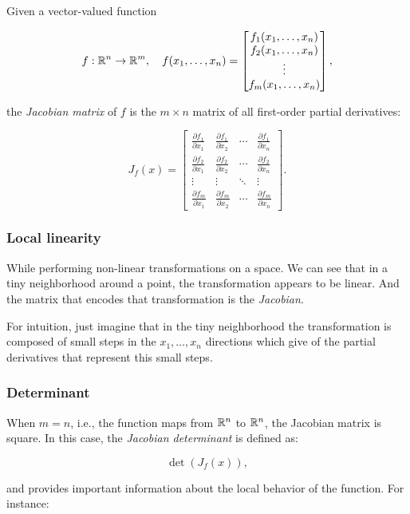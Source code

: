 Given a vector-valued function

\[
    f : \mathbb{R}^n \rightarrow \mathbb{R}^m, \quad f(x_1, \ldots, x_n) = 
    \begin{bmatrix}
    f_1(x_1, \ldots, x_n) \\
    f_2(x_1, \ldots, x_n) \\
    \vdots \\
    f_m(x_1, \ldots, x_n)
    \end{bmatrix},
\]

the \emph{Jacobian matrix} of \(f\) is the \(m \times n\) matrix of all first-order partial derivatives:

\[
    J_f(x) = \begin{bmatrix}
    \frac{\partial f_1}{\partial x_1} & \frac{\partial f_1}{\partial x_2} & \cdots & \frac{\partial f_1}{\partial x_n} \\
    \frac{\partial f_2}{\partial x_1} & \frac{\partial f_2}{\partial x_2} & \cdots & \frac{\partial f_2}{\partial x_n} \\
    \vdots & \vdots & \ddots & \vdots \\
    \frac{\partial f_m}{\partial x_1} & \frac{\partial f_m}{\partial x_2} & \cdots & \frac{\partial f_m}{\partial x_n}
    \end{bmatrix}.
\]

\subsubsection{Local linearity}

While performing non-linear transformations on a space. We can see that in a tiny neighborhood
around a point, the transformation appears to be linear. And the matrix that encodes that
transformation is the \emph{Jacobian}.

For intuition, just imagine that in the tiny neighborhood the transformation is composed
of small steps in the \(x_1, \dots, x_n\) directions which give of the partial derivatives that
represent this small steps. 

\subsubsection{Determinant}
When \(m = n\), i.e., the function maps from 
\(\mathbb{R}^n\) to \(\mathbb{R}^n\), 
the Jacobian matrix is square. In this case, 
the \emph{Jacobian determinant} is defined as:

\[
    \det(J_{f}(x)),
\]

and provides important information about the local behavior of the function. For instance:


